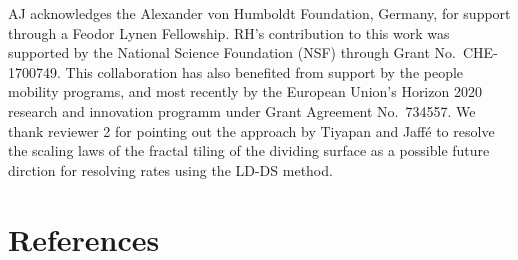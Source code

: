 \documentclass[aip,reprint,jcp,amsmath,amssymb,superscriptaddress,floatfix]{revtex4-1}
\begin{document}
\begin{acknowledgments}
AJ acknowledges the Alexander von Humboldt Foundation, Germany, 
for support through a Feodor Lynen Fellowship.
RH's contribution to this work was supported by
the National Science Foundation (NSF) through Grant
No.~CHE-1700749.
This collaboration has also benefited from support
by the people mobility programs, and most recently by the
European Union’s Horizon 2020 research and innovation
programm under Grant Agreement No.~734557.
We thank reviewer 2 for pointing out the approach by Tiyapan and
Jaff\'e\cite{jaffe94,jaffe95} to resolve the scaling laws of the fractal
tiling of the dividing surface as a possible future dirction
for resolving rates using the LD-DS method.
\end{acknowledgments}


\section*{References}

\end{document}
